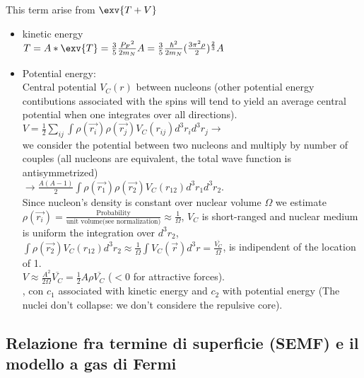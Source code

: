This term arise from $\exv{T+V}$\\
\begin{itemize}
\item kinetic energy\\
$T=A*\exv{T}=\frac{3}{5}\frac{{P_F}^2}{2m_N}A=\frac{3}{5}\frac{\hbar^2}{2m_N}(\frac{3\pi^2\rho}{2})^{\frac{2}{3}}A$
\item Potential energy:\\
Central potential $V_C(r)$ between nucleons (other potential energy contibutions associated with the spins will tend to yield an average central potential when one integrates over all directions).\\
$V=\frac{1}{2}\sum_{ij}\int\rho(\vec{r_i})\rho(\vec{r_j})V_C(r_{ij})d^3r_id^3r_j\rightarrow$\\
we consider the potential between two nucleons and multiply by number of couples (all nucleons are equivalent, the total wave function is antisymmetrized)\\
$\rightarrow\frac{A(A-1)}{2}\int\rho(\vec{r_1})\rho(\vec{r_2})V_C(r_{12})d^3r_1d^3r_2$.\\
Since nucleon's density is constant over nuclear volume  $\Omega$ we estimate $\rho(\vec{r_i})=\frac{\text{Probability}}{\text{unit volume(see normalization)}}\approx\frac{1}{\Omega}$, $V_C$ is short-ranged and nuclear medium is uniform  the integration over $d^3r_2$,  $\int\rho(\vec{r_2})V_C(r_{12})d^3r_2\approx\frac{1}{\Omega}\int V_C(\vec{r})d^3r=\frac{\overline{V_C}}{\Omega}$, is indipendent of the location of 1.\\
 $V\approx\frac{A^2}{2\Omega}\overline{V_C}=\frac{1}{2}A\rho\overline{V_C} $ ($<0$ for attractive forces).\\
, con $c_1$ associated with kinetic energy and $c_2$ with potential energy (The nuclei don't collapse: we don't considere the repulsive core).
\end{itemize}

\subsection{Relazione fra termine di superficie (SEMF) e il modello a gas di Fermi}

